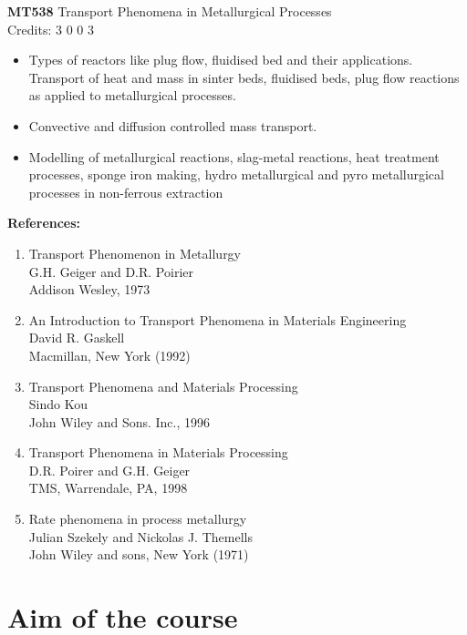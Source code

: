 \pagebreak

{\bf MT538} Transport Phenomena in Metallurgical Processes\\
Credits: 3 0 0 3

\begin{itemize}
\item Types of reactors like plug flow, fluidised bed and their applications. Transport of heat and mass in sinter beds, fluidised beds, plug flow reactions as applied to metallurgical processes.

\item Convective and diffusion controlled mass transport. 

\item Modelling of metallurgical reactions, slag-metal reactions, heat treatment processes, sponge iron making, hydro metallurgical and pyro metallurgical processes in non-ferrous extraction

\end{itemize} 

{\bf References:}

\begin{enumerate}
\item Transport Phenomenon in Metallurgy \\
G.H. Geiger and D.R. Poirier\\
Addison Wesley, 1973
\item An Introduction to Transport Phenomena in Materials Engineering\\
David R. Gaskell\\
Macmillan, New York (1992)
\item Transport Phenomena and Materials Processing\\
Sindo Kou \\
John Wiley and Sons. Inc., 1996 
\item Transport Phenomena in Materials Processing\\
D.R. Poirer and G.H. Geiger\\
TMS, Warrendale, PA, 1998
\item Rate phenomena in process metallurgy\\
Julian Szekely and Nickolas J. Themells\\
John Wiley and sons, New York (1971) 
\end{enumerate} 

\section{Aim of the course}

